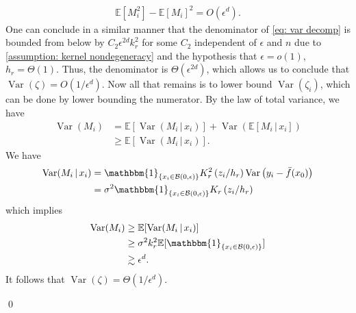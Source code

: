 \documentclass[11pt]{article}
\begin{document}
\begin{align}
    \mathbb{E}\left[M_i^2\right] - \mathbb{E}\left[M_i\right]^2 = O(\epsilon^d).
\end{align}
One can conclude in a similar manner that the denominator of \cref{eq: var decomp} is bounded from below by $C_2\epsilon^{2d}k_r^2$ for some $C_2$ independent of $\epsilon$ and $n$ due to \cref{assumption: kernel nondegeneracy} and the hypothesis that $\epsilon = o(1)$, $h_r = \Theta(1)$. Thus, the denominator is $\Theta(\epsilon^{2d})$, which allows us to conclude that $\operatorname{Var}(\zeta) = O(1/\epsilon^{d})$. Now all that remains is to lower bound $\operatorname{Var}(\zeta_i)$, which can be done by lower bounding the numerator. By the law of total variance, we have
\begin{align*}
    \operatorname{Var}(M_i) &= \mathbb{E}[\operatorname{Var}(M_i \,|\, x_i)] + \operatorname{Var}(\mathbb{E}[M_i \,|\, x_i]) \\
    &\geq \mathbb{E}[\operatorname{Var}(M_i \,|\, x_i)].
\end{align*}
We have
\begin{align*}
    \operatorname{Var}(M_i \, |\, x_i) &= \mathbbm{1}_{\{x_i \in \mathcal{B}(0, \epsilon)\}}K_r^2\left(z_i/h_r \right) \operatorname{Var}\left(y_i - \bar{f}(x_0)\right) \\
    &= \sigma^2 \mathbbm{1}_{\{x_i \in \mathcal{B}(0, \epsilon)\}}K_r\left(z_i/h_r \right)
\end{align*}
which implies 
\begin{align*}
    \operatorname{Var}(M_i) &\geq \mathbb{E}[\operatorname{Var}(M_i \,|\, x_i)] \\
    & \geq \sigma^2k_r^2\mathbb{E}[\mathbbm{1}_{\{x_i \in \mathcal{B}(0, \epsilon)\}}] \\
    &\gtrsim \epsilon^d.
\end{align*}
It follows that $\operatorname{Var}(\zeta) = \Theta(1/\epsilon^d).$

\qed{}
\end{document}

